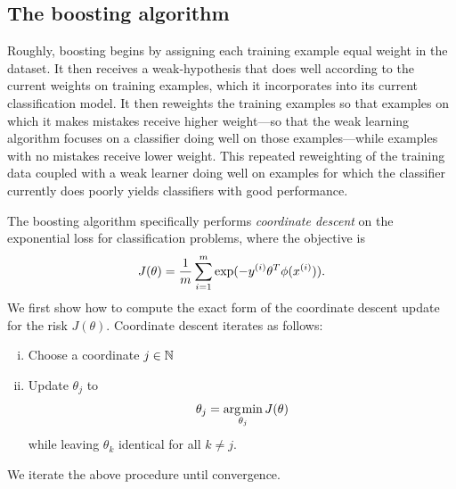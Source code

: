 \documentclass{article}
\newcommand{\represent}{\phi}
\begin{document}
\subsection{The boosting algorithm}

Roughly, boosting begins by assigning each training example equal weight in
the dataset. It then receives a weak-hypothesis that does well according to
the current weights on training examples, which it incorporates into its
current classification model. It then reweights the training examples so
that examples on which it makes mistakes receive higher weight---so that the
weak learning algorithm focuses on a classifier doing well on those
examples---while examples with no mistakes receive lower weight. This
repeated reweighting of the training data coupled with a weak learner doing
well on examples for which the classifier currently does poorly yields
classifiers with good performance.

The boosting algorithm specifically performs \emph{coordinate descent}
on the exponential loss for classification problems, where the
objective is
\begin{equation*}
  J(\theta) = \frac{1}{m} \sum_{i = 1}^m \exp(-\ysi \theta^T \represent(\xsi)).
\end{equation*}
We first show how to compute the exact form of the coordinate descent
update for the risk $J(\theta)$. Coordinate descent iterates as follows:
\begin{enumerate}[(i)]
\item Choose a coordinate $j \in \mathbb{N}$
\item Update $\theta_j$ to
  \begin{equation*}
    \theta_j = \mathop{\rm arg\hspace{.1em}min}_{\theta_j} J(\theta)
  \end{equation*}
  while leaving $\theta_k$ identical for all $k \neq j$.
\end{enumerate}
We iterate the above procedure until convergence.
\end{document}
